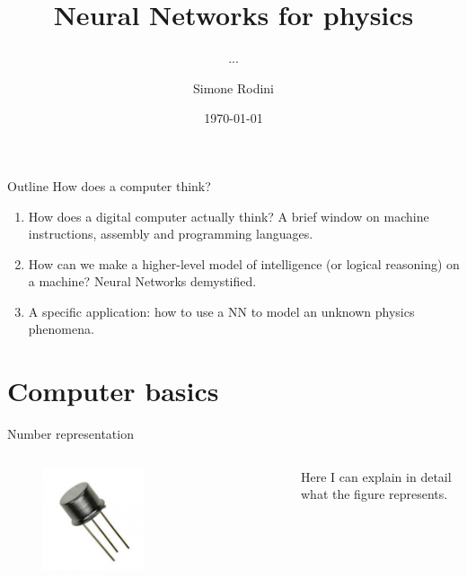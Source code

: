 \documentclass[10pt]{beamer}
\title{Neural Networks for physics}
\subtitle{...}
\author[S. Rodini]{Simone Rodini}
\date[\today]{\today}
\renewcommand{\[}{\begin{equation}}
\renewcommand{\]}{\end{equation}}
\begin{document}
\frame{\titlepage}
\section{}
\begin{frame}{Outline}
How does a computer think? 
\begin{enumerate}
\item How does a digital computer actually think? A brief window on machine instructions, assembly and programming languages.
\item How can we make a higher-level model of intelligence (or logical reasoning) on a machine? Neural Networks demystified.
\item A specific application: how to use a NN to model an unknown physics phenomena.
\end{enumerate}
\end{frame}

\section{Computer basics}

\begin{frame}{Number representation}
\begin{columns}
   
\begin{column}{0.3\textwidth}
\begin{figure}
\centering
\includegraphics[width=0.5\textwidth]{Notes/Figures/transistor.jpg}
\end{figure}
\end{column}

\begin{column}{0.7\textwidth}
        Here I can explain in detail what the figure represents.
\end{column}
\end{columns}
\end{frame}





\end{document}
